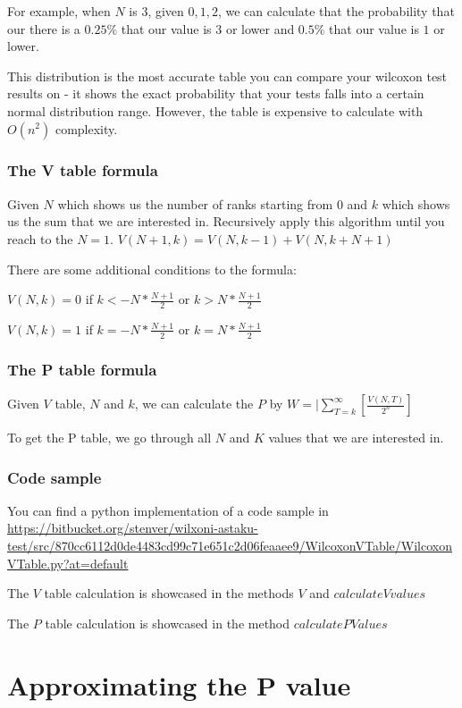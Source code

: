 \documentclass[12pt]{article}
\begin{document}
For example, when $N$ is $3$, given $0, 1, 2$, we can calculate that the probability that our there is a $0.25\%$ that our value is $3$ or lower and $0.5\%$ that our value is $1$ or lower.

This distribution is the most accurate table you can compare your wilcoxon test results on - it shows the exact probability that your tests falls into a certain normal distribution range. However, the table is expensive to calculate with $O(n^2)$ complexity.

\subsubsection{The V table formula}
Given $N$ which shows us the number of ranks starting from $0$ and $k$ which shows us the sum that we are interested in. Recursively apply this algorithm until you reach to the $N = 1$.
$V(N+1, k) = V(N, k-1) + V(N, k+N+1)$

There are some additional conditions to the formula:

$V(N, k) = 0$ if $k < -N * \frac{N+1}{2}$ or $k > N * \frac{N+1}{2}$

$V(N, k) = 1$ if $k = -N * \frac{N+1}{2}$ or $k = N * \frac{N+1}{2}$

\subsubsection{The P table formula}
Given $V$ table, $N$ and $k$, we can calculate the $P$ by
$W=|\sum\limits_{T = k}^{\infty}[\frac{V(N, T)}{2^n}]$

To get the P table, we go through all $N$ and $K$ values that we are interested in.

\subsubsection{Code sample}
You can find a python implementation of a code sample in
\url{https://bitbucket.org/stenver/wilxoni-astaku-test/src/870cc6112d0de4483cd99c71e651c2d06feaaee9/WilcoxonVTable/WilcoxonVTable.py?at=default}

The $V$ table calculation is showcased in the methods $V$ and $calculateVvalues$

The $P$ table calculation is showcased in the method $calculatePValues$

\newpage

\section{Approximating the P value}
\end{document}
